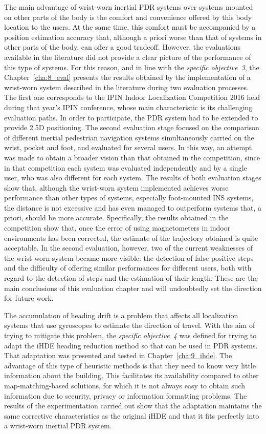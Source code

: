 The main advantage of wrist-worn inertial PDR systems over systems mounted on other parts of the body is the comfort and convenience offered by this body location to the users. 
At the same time, this comfort must be accompanied by a position estimation accuracy that, although a priori worse than that of systems in other parts of the body, can offer a good tradeoff.
However, the evaluations available in the literature did not provide a clear picture of the performance of this type of systems.
For this reason, and in line with the \emph{specific objective~3}, the Chapter~\ref{cha:8_eval} presents the results obtained by the implementation of a wrist-worn system described in the literature during two evaluation processes.
The first one corresponds to the IPIN Indoor Localization Competition 2016 held during that year’s IPIN conference, whose main characteristic is its challenging evaluation paths.
In order to participate, the PDR system had to be extended to provide 2.5D positioning.
The second evaluation stage focused on the comparison of different inertial pedestrian navigation systems simultaneously carried on the wrist, pocket and foot, and evaluated for several users.
In this way, an attempt was made to obtain a broader vision than that obtained in the competition, since in that competition each system was evaluated independently and by a single user, who was also different for each system.
The results of both evaluation stages show that, although the wrist-worn system implemented achieves worse performance than other types of systems, especially foot-mounted INS systems, the distance is not excessive and has even managed to outperform systems that, a priori, should be more accurate.
Specifically, the results obtained in the competition show that, once the error of using magnetometers in indoor environments has been corrected, the estimate of the trajectory obtained is quite acceptable.
In the second evaluation, however, two of the current weaknesses of the wrist-worn system became more visible: the detection of false positive steps and the difficulty of offering similar performances for different users, both with regard to the detection of steps and the estimation of their length.
These are the main conclusions of this evaluation chapter and will undoubtedly set the direction for future work.

The accumulation of heading drift is a problem that affects all localization systems that use gyroscopes to estimate the direction of travel.
With the aim of trying to mitigate this problem, the \emph{specific objective~4} was defined for trying to adapt the iHDE heading reduction method so that can be used in PDR systems.
That adaptation was presented and tested in Chapter~\ref{cha:9_ihde}.
The advantage of this type of heuristic methods is that they need to know very little information about the building.
This facilitates its availability compared to other map-matching-based solutions, for which it is not always easy to obtain such information due to security, privacy or information formatting problems.
The results of the experimentation carried out show that the adaptation maintains the same corrective characteristics as the original iHDE and that it fits perfectly into a wrist-worn inertial PDR system.

